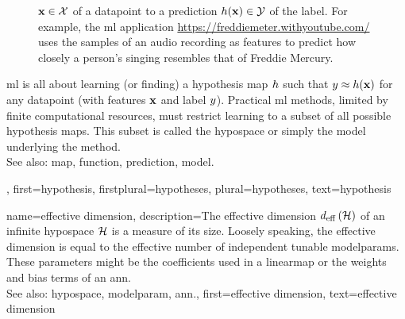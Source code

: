 {{\begin{figure}[H]
{			${\bf x} \in \mathcal{X}$ of a \gls{datapoint} to a \gls{prediction} $h({\bf x}) \in \mathcal{Y}$ of the \gls{label}. 
			For example, the \gls{ml} application \url{https://freddiemeter.withyoutube.com/} uses the \glspl{sample} of an audio 
			recording as \glspl{feature} to predict how closely a person’s singing resembles that of Freddie Mercury. }
		\end{figure}
		\Gls{ml} is all about learning (or finding) a hypothesis \gls{map} $h$ 
		such that $y \approx h({\bf x})$ for any \gls{datapoint} 
		(with \glspl{feature} ${\bf x}$ and \gls{label} $y$). Practical \gls{ml} methods, 
		limited by finite computational resources, must restrict learning to a subset of all possible 
		hypothesis \glspl{map}. This subset is called the \gls{hypospace} or simply the \gls{model} underlying 
		the method.
					\\ 
		See also: \gls{map}, \gls{function}, \gls{prediction}, \gls{model}.},
	first={hypothesis},
	firstplural={hypotheses},
	plural={hypotheses},
	text={hypothesis}  
}

{name={effective dimension},
	description={The effective \gls{dimension} $d_{\rm eff} \left( \mathcal{H} \right)$ of 
		an infinite \gls{hypospace} $\mathcal{H}$ is a \gls{measure} of its size. Loosely speaking, the 
		effective \gls{dimension} is equal to the effective number of independent tunable \glspl{modelparam}. 
		These \glspl{parameter} might be the coefficients used in a \gls{linearmap} or the 
		\glspl{weight} and \gls{bias} terms of an \gls{ann}.
					\\ 
		See also: \gls{hypospace}, \gls{modelparam}, \gls{ann}.},
	first={effective dimension},
	text={effective dimension}  
}

